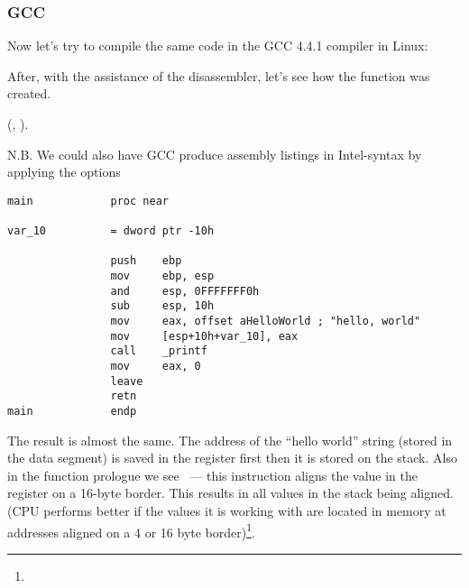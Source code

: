 \subsubsection{GCC}

{Now let's try to compile the same \CCpp code in the GCC 4.4.1 compiler in Linux}: 

{After, with the assistance of the \IDA disassembler, let's see how the \main function was created.} 

(\IDA, ).

N.B. 
{We could also have GCC produce assembly listings in Intel-syntax by applying the options} 

\begin{lstlisting}[caption=GCC]
main            proc near

var_10          = dword ptr -10h

                push    ebp
                mov     ebp, esp
                and     esp, 0FFFFFFF0h
                sub     esp, 10h
                mov     eax, offset aHelloWorld ; "hello, world"
                mov     [esp+10h+var_10], eax
                call    _printf
                mov     eax, 0
                leave
                retn
main            endp
\end{lstlisting}

{The result is almost the same.
The address of the ``hello world'' string (stored in the data segment) is saved in the \EAX register first then it is stored on the stack.
Also in the function prologue we see  ~--- 
this instruction aligns the value in the \ESP register on a 16-byte border.
This results in all values in the stack being aligned.
(CPU performs better if the values it is working with are located in memory at addresses aligned 
on a 4 or 16 byte border)\footnote{\URLWPDA}.}

